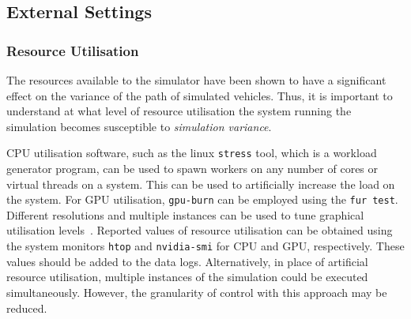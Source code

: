 \documentclass[letterpaper, 10 pt, journal, twoside]{IEEEtran}
\begin{document}


\subsection{External Settings} \label{ego_actor}

\subsubsection{Resource Utilisation}
The resources available to the simulator have been shown to have a significant effect on the variance of the path of simulated vehicles. %
%
Thus, it is important to understand at what level of resource utilisation the system running the simulation becomes susceptible to \textit{simulation variance}.

CPU utilisation software, such as the linux \texttt{stress} tool, which is a workload generator program, can be used to spawn workers on any number of cores or virtual threads on a system. This can be used to artificially increase the load on the system. For GPU utilisation, \texttt{gpu-burn} can be employed using the \texttt{fur test}. Different resolutions and multiple instances can be used to tune graphical utilisation levels~\cite{GPU_stress}. Reported values of resource utilisation can be obtained using the system monitors \texttt{htop} and \texttt{nvidia-smi} for CPU and GPU, respectively. These values should be added to the data logs.
%
Alternatively, in place of artificial resource utilisation, multiple instances of the simulation could be executed simultaneously. However, the granularity of control with this approach may be reduced.


\end{document}
